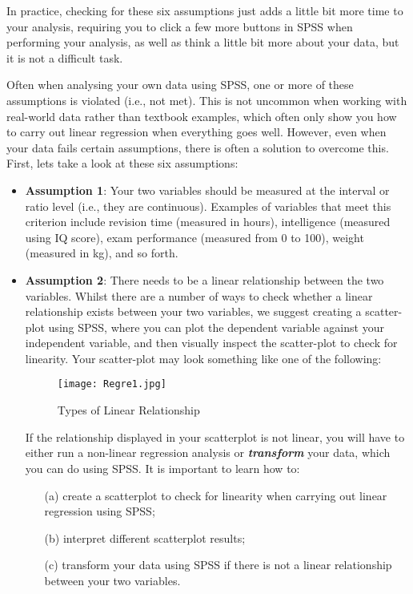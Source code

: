 In practice, checking for these six assumptions just adds a little bit more time to your analysis, requiring you to click a few more buttons in SPSS when performing your analysis, as well as think a little bit more about your data, but it is not a difficult task.

Often when analysing your own data using SPSS, one or more of these assumptions is violated (i.e., not met). This is not uncommon when working with real-world data rather than textbook examples, which often only show you how to carry out linear regression when everything goes well. However, even when your data fails certain assumptions, there is often a solution to overcome this. First, lets take a look at these six assumptions:

\begin{itemize}
\item \textbf{Assumption 1}: Your two variables should be measured at the interval or ratio level (i.e., they are continuous). Examples of variables that meet this criterion include revision time (measured in hours), intelligence (measured using IQ score), exam performance (measured from 0 to 100), weight (measured in kg), and so forth. 

\item \textbf{Assumption 2}: There needs to be a linear relationship between the two variables. Whilst there are a number of ways to check whether a linear relationship exists between your two variables, we suggest creating a scatter-plot using SPSS, where you can plot the dependent variable against your independent variable, and then visually inspect the scatter-plot to check for linearity. Your scatter-plot may look something like one of the following:



\begin{figure}[h!]
\begin{centering}
  \texttt{[image: Regre1.jpg]}\\
  \caption{Types of Linear Relationship}
\end{centering}
\end{figure}
If the relationship displayed in your scatterplot is not linear, you will have to either run a non-linear regression analysis or \textbf{\textit{transform}} your data, which you can do using SPSS. It is important to learn how to:
\begin{itemize}
	\item[(a)] create a scatterplot to check for linearity when carrying out linear regression using SPSS; 
	\item[(b)] interpret different scatterplot results; 
	\item[(c)] transform your data using SPSS if there is not a linear relationship between your two variables.
\end{itemize} 



\end{itemize}

